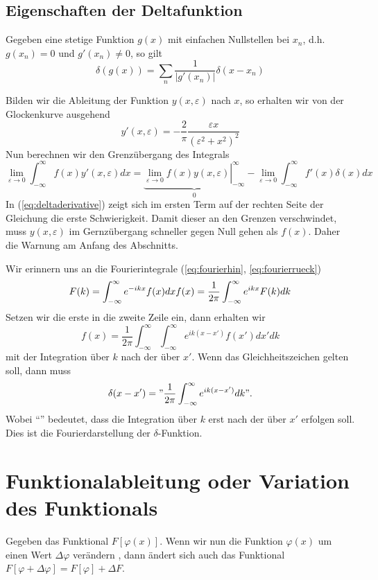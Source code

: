 \subsection{Eigenschaften der Deltafunktion}
Gegeben eine stetige Funktion $g(x)$ mit einfachen Nullstellen bei $x_n$, d.h.
$g(x_n)=0$ und $g'(x_n)\ne 0$, so gilt
\[\delta(g(x))=\sum\limits_n\frac{1}{|g'(x_n)|}\delta(x-x_n)\]

Bilden wir die Ableitung der Funktion $y(x,\varepsilon)$ nach $x$, so erhalten
wir von der Glockenkurve ausgehend 
\[y'(x,\varepsilon)=-\frac{2}{\pi}\frac{\varepsilon x}{(\varepsilon^2+x^2)^2}\]
Nun berechnen wir den Grenzübergang des Integrals
\begin{equation}\label{eq:deltaderivative}
\lim_{\varepsilon\rightarrow 0}\int_{-\infty}^{\infty}f(x)y'(x,\varepsilon)dx=
\underbrace{\left.\lim_{\varepsilon\rightarrow 0}f(x)y(x,\varepsilon)\right|_{-\infty}^{\infty}}_{0}
-\lim_{\varepsilon\rightarrow 0}\int_{-\infty}^{\infty}f'(x)\delta(x)dx
\end{equation}
In (\ref{eq:deltaderivative}) zeigt sich im ersten Term auf der rechten Seite
der Gleichung die erste Schwierigkeit. Damit dieser an den Grenzen
verschwindet, muss $y(x,\varepsilon)$ im Gernzübergang schneller gegen Null
gehen als $f(x)$. Daher die Warnung am Anfang des Abschnitts.

Wir erinnern uns an die Fourierintegrale (\ref{eq:fourierhin}, \ref{eq:fourierrueck})
\[
F(k)=\int_{-\infty}^{\infty}e^{-ikx}f(x)dx\\
f(x)=\frac{1}{2\pi}\int_{-\infty}^{\infty}e^{ikx}F(k)dk
\]
Setzen wir die erste in die zweite Zeile ein, dann erhalten wir
\[f(x)=\frac{1}{2\pi}\int_{-\infty}^{\infty}\int_{-\infty}^{\infty}e^{ik(x-x')}f(x')dx'dk\]
mit der Integration über $k$ nach der über $x'$. Wenn das Gleichheitszeichen
gelten soll, dann muss
\[\delta(x-x')="\frac{1}{2\pi}\int_{-\infty}^{\infty}e^{ik(x-x')}dk".\]
Wobei ``'' bedeutet, dass die Integration über $k$ erst nach der über $x'$
erfolgen soll. Dies ist die Fourierdarstellung der $\delta$-Funktion.
%
\section{Funktionalableitung oder Variation des Funktionals}\label{sec:Funktionalableitung}
Gegeben das Funktional $F[\varphi(x)]$. Wenn wir nun die Funktion $\varphi(x)$
um einen Wert $\Delta\varphi$ verändern , dann ändert
sich auch das Funktional
$F[\varphi+\Delta\varphi]=F[\varphi]+\Delta F$. 

